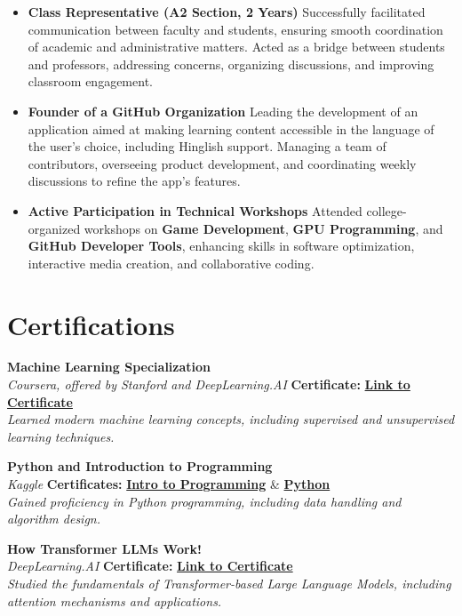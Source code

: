 \documentclass[10pt, letterpaper]{article}
\begin{document}
\begin{itemize}
    \item \textbf{Class Representative (A2 Section, 2 Years)}  
    Successfully facilitated communication between faculty and students, ensuring smooth coordination of academic and administrative matters. Acted as a bridge between students and professors, addressing concerns, organizing discussions, and improving classroom engagement.

    \item \textbf{Founder of a GitHub Organization}  
    Leading the development of an application aimed at making learning content accessible in the language of the user's choice, including Hinglish support. Managing a team of contributors, overseeing product development, and coordinating weekly discussions to refine the app’s features.

    \item \textbf{Active Participation in Technical Workshops}  
    Attended college-organized workshops on \textbf{Game Development}, \textbf{GPU Programming}, and \textbf{GitHub Developer Tools}, enhancing skills in software optimization, interactive media creation, and collaborative coding.
\end{itemize}

\section{Certifications}
\textbf{Machine Learning Specialization} \\
\textit{Coursera, offered by Stanford and DeepLearning.AI} \hfill \textbf{Certificate:} \href{https://coursera.org/verify/specialization/B9AOWDR6WW1J}{\textbf{Link to Certificate}} \\
\textit{Learned modern machine learning concepts, including supervised and unsupervised learning techniques.}

\textbf{Python and Introduction to Programming} \\
\textit{Kaggle} \hfill \textbf{Certificates:} \href{https://drive.google.com/file/d/16X0GA5LLuLK1exiCj-5QL-jaMwlfS0OK/view?usp=sharing}{\textbf{Intro to Programming}} \& \href{https://drive.google.com/file/d/1Z36kwNNuXHeY8KCLyePWYNFuTbkLF2n0/view?usp=sharing}{\textbf{Python}} \\
\textit{Gained proficiency in Python programming, including data handling and algorithm design.}

\textbf{How Transformer LLMs Work!} \\
\textit{DeepLearning.AI} \hfill \textbf{Certificate:} \href{https://learn.deeplearning.ai/accomplishments/9a7b037f-773d-4353-b5c5-8302d39d94e6?usp=sharing}{\textbf{Link to Certificate}} \\
\textit{Studied the fundamentals of Transformer-based Large Language Models, including attention mechanisms and applications.}
\end{document}
